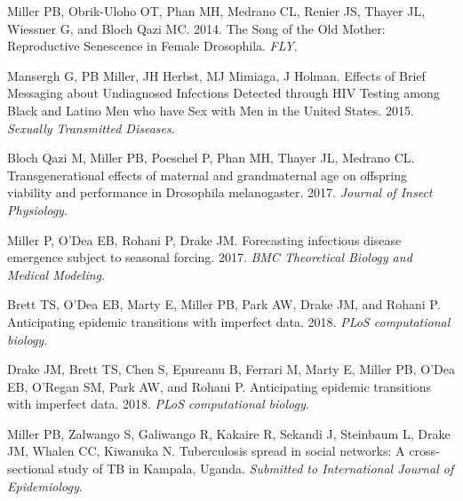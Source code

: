 \documentclass[letterpaper]{article}
\renewenvironment{itemize}{
  \begin{list}{}{
    \setlength{\leftmargin}{1.5em}
  }
}{
  \end{list}
}
\begin{document}
\begin{itemize}
\item Miller PB, Obrik-Uloho OT, Phan MH, Medrano CL, Renier JS, Thayer JL, Wiessner G, and Bloch Qazi MC. 2014. The Song of the Old Mother: Reproductive Senescence in Female Drosophila. \textit{FLY}.
\item Mansergh G, PB Miller, JH Herbst, MJ Mimiaga, J Holman. Effects of Brief Messaging about Undiagnosed Infections Detected through HIV Testing among Black and Latino Men who have Sex with Men in the United States. 2015. \textit{Sexually Transmitted Diseases}.
\item Bloch Qazi M, Miller PB, Poeschel P, Phan MH, Thayer JL, Medrano CL. Transgenerational effects of maternal and grandmaternal age on offspring viability and performance in Drosophila melanogaster. 2017. \textit{Journal of Insect Physiology}.
\item Miller P, O'Dea EB, Rohani P, Drake JM. Forecasting infectious disease emergence subject to seasonal forcing. 2017. \textit{BMC Theoretical Biology and Medical Modeling}.
\item Brett TS,  O'Dea EB, Marty E, Miller PB, Park AW, Drake JM, and Rohani P. Anticipating epidemic transitions with imperfect data. 2018. \textit{PLoS computational biology}. 
\item Drake JM, Brett TS,  Chen S, Epureanu B, Ferrari M, Marty E, Miller PB, O'Dea EB, O'Regan SM, Park AW, and Rohani P. Anticipating epidemic transitions with imperfect data. 2018. \textit{PLoS computational biology}. 
\item Miller PB, Zalwango S, Galiwango R, Kakaire R, Sekandi J, Steinbaum L, Drake JM, Whalen CC, Kiwanuka N. Tuberculosis spread in social networks: A cross-sectional study of TB in Kampala, Uganda. \textit{Submitted to International Journal of Epidemiology}. 
\end{itemize}
\end{document}

